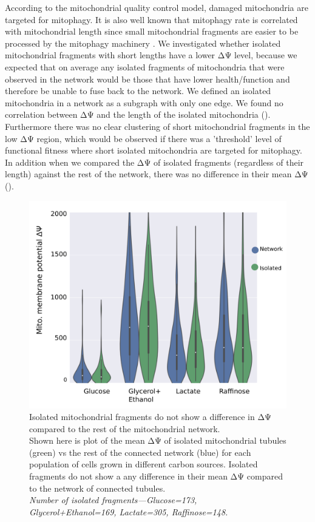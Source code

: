 According to the mitochondrial quality control model, damaged mitochondria are targeted for mitophagy. It is also well known that mitophagy rate is correlated with mitochondrial length since small mitochondrial fragments are easier to be processed by the mitophagy machinery \cite{kanki_mitophagy_2008,rambold_tubular_2011}. We investigated whether isolated mitochondrial fragments with short lengths have a lower ΔΨ level, because we expected that on average any isolated fragments of mitochondria that were observed in the network would be those that have lower health/function and therefore be unable to fuse back to the network. We defined an isolated mitochondria in a network as a subgraph with only one edge. We found no correlation between ΔΨ and the length of the isolated mitochondria (). Furthermore there was no clear clustering of short mitochondrial fragments in the low ΔΨ region, which would be observed if there was a 'threshold' level of functional fitness where short isolated mitochondria are targeted for mitophagy. In addition when we compared the ΔΨ of isolated fragments (regardless of their length) against the rest of the network, there was no difference in their mean ΔΨ ().
%
\begin{figure}[htp]
	\centering
    \includegraphics[width=.75\textwidth]{isorest}
    \caption[Isolated mitochondrial fragments do not show a difference in ΔΨ compared to the rest of the mitochondrial network]{Isolated mitochondrial fragments do not show a difference in ΔΨ compared to the rest of the mitochondrial network.\\Shown here is plot of the mean ΔΨ of isolated mitochondrial tubules (green) vs the rest of the connected network (blue) for each population of cells grown in different carbon sources. Isolated fragments do not show a any difference in their mean ΔΨ compared to the network of connected tubules.\\\emph{Number of isolated fragments---Glucose=173, Glycerol+Ethanol=169, Lactate=305, Raffinose=148.}}\label{fig:isorest}
\end{figure}
%


